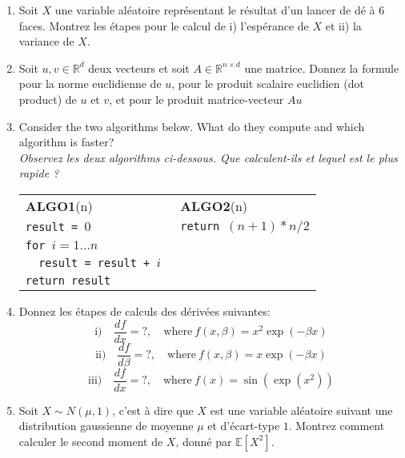 \begin{enumerate}

\item {}
%
{Soit $X$ une variable aléatoire représentant le résultat d'un lancer de dé à 6 faces. Montrez les étapes pour le calcul de 
i) l'espérance de $X$ et
ii) la variance de $X$.}

\item {}
%
{Soit $u,v\in \mathbb{R}^d$ deux vecteurs et soit $A\in\mathbb{R}^{n\times d}$ une matrice. Donnez la formule pour la norme euclidienne de $u$, pour le produit scalaire euclidien (dot product) de $u$ et $v$, et pour le produit matrice-vecteur $Au$}

\item {}
Consider the two algorithms below. What do they compute and which algorithm is faster? \\
\textit{Observez les deux algorithms ci-dessous. Que calculent-ils et lequel est le plus rapide ?}

\begin{tabular}{ll}
\textbf{ALGO1}(n) \hspace{4cm} & \textbf{ALGO2}(n) \\
\texttt{result = $0$}     &  \texttt{return $(n+1)*n/2$}  \\ 
\texttt{for $i=1\dots n$} & \\
\texttt{\ \ result = result + $i$  } & \\
\texttt{return result} &
\end{tabular}


\item {}
%
{Donnez les étapes de calculs des dérivées suivantes:}
$$
  \textrm{i)} \quad \frac{df}{dx}=?, \quad \textrm{where}\  f(x,\beta) = x^2 \exp{(-\beta x)} 
$$
$$
  \textrm{ii)} \quad \frac{df}{d\beta}=?, \quad \textrm{where}\  f(x,\beta) = x \exp{(-\beta x)} 
$$
$$
  \textrm{iii)} \quad \frac{df}{dx}=?, \quad \textrm{where}\  f(x) = \sin{(\exp{(x^2)})} 
$$


\item {}
%
{Soit $X\sim N(\mu,1)$, c'est à dire que $X$ est une variable aléatoire suivant une distribution gaussienne de moyenne $\mu$ et d'écart-type $1$. Montrez comment calculer le second moment de $X$, donné par $\mathbb{E}[X^2]$.}

\end{enumerate}


